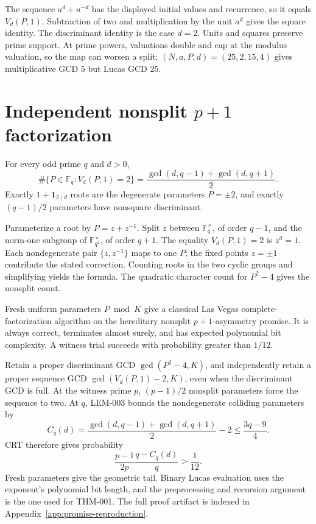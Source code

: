 \documentclass[11pt]{article}
\begin{document}
\begin{claimproof}
The sequence \(a^d+a^{-d}\) has the displayed initial values and recurrence,
so it equals \(V_d(P,1)\).  Subtraction of two and multiplication by the unit
\(a^d\) gives the square identity.  The discriminant identity is the case
\(d=2\).  Units and squares preserve prime support.  At prime powers,
valuations double and cap at the modulus valuation, so the map can worsen a
split; \((N,a,P,d)=(25,2,15,4)\) gives multiplicative GCD \(5\) but Lucas
GCD \(25\).
\end{claimproof}

\section{Independent nonsplit \texorpdfstring{\(p+1\)}{p+1} factorization}

{}
For every odd prime \(q\) and \(d>0\),
\[
 \#\{P\in\mathbb F_q:V_d(P,1)=2\}
 =\frac{\gcd(d,q-1)+\gcd(d,q+1)}2.
\]
Exactly \(1+\mathbf1_{2\mid d}\) roots are the degenerate parameters
\(P=\pm2\), and exactly \((q-1)/2\) parameters have nonsquare discriminant.

\begin{claimproof}
Parameterize a root by \(P=z+z^{-1}\).  Split \(z\) between
\(\mathbb F_q^\times\), of order \(q-1\), and the norm-one subgroup of
\(\mathbb F_{q^2}^\times\), of order \(q+1\).  The equality \(V_d(P,1)=2\)
is \(z^d=1\).  Each nondegenerate pair \(\{z,z^{-1}\}\) maps to one \(P\);
the fixed points \(z=\pm1\) contribute the stated correction.  Counting
roots in the two cyclic groups and simplifying yields the formula.  The
quadratic character count for \(P^2-4\) gives the nonsplit count.
\end{claimproof}

{}
Fresh uniform parameters \(P\bmod K\) give a
classical Las Vegas complete-factorization algorithm on the hereditary
nonsplit \(p+1\)-asymmetry promise.  It is always correct, terminates almost
surely, and has expected polynomial bit complexity.  A witness trial
succeeds with probability greater than \(1/12\).

\begin{claimproof}
Retain a proper discriminant GCD \(\gcd(P^2-4,K)\), and independently retain
a proper sequence GCD
\(\gcd(V_d(P,1)-2,K)\), even when the discriminant GCD is full.  At the
witness prime \(p\), \((p-1)/2\) nonsplit parameters force the sequence to
two.  At \(q\), LEM-003 bounds the nondegenerate colliding parameters by
\[
 C_q(d)=\frac{\gcd(d,q-1)+\gcd(d,q+1)}2-2
 \le\frac{3q-9}{4}.
\]
CRT therefore gives probability
\[
 \frac{p-1}{2p}\frac{q-C_q(d)}q>\frac1{12}.
\]
Fresh parameters give the geometric tail.  Binary Lucas evaluation uses
the exponent's polynomial bit length, and the preprocessing and recursion
argument is the one used for THM-001.  The full proof artifact is indexed in
Appendix~\ref{app:promise-reproduction}.
\end{claimproof}
\end{document}
